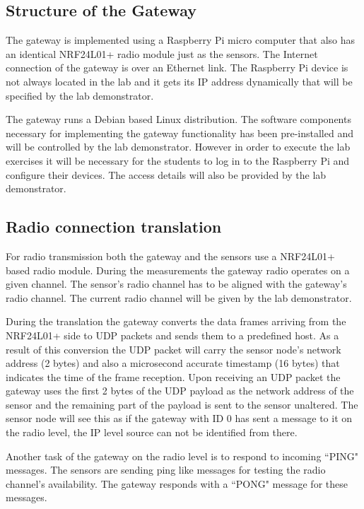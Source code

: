 \documentclass[a4paper]{article}
\begin{document}
\subsection{Structure of the Gateway}

The gateway is implemented using a Raspberry Pi micro computer that also has an identical NRF24L01+
radio module just as the sensors. The Internet connection of the gateway is over an Ethernet link.
The Raspberry Pi device is not always located in the lab and it gets its IP address dynamically
that will be specified by the lab demonstrator.

The gateway runs a Debian based Linux distribution. The software components necessary for
implementing the gateway functionality has been pre-installed and will be controlled by the
lab demonstrator. However in order to execute the lab exercises it will be necessary for the students
to log in to the Raspberry Pi and configure their devices. The access details will also be provided
by the lab demonstrator.

\subsection{Radio connection translation}

For radio transmission both the gateway and the sensors use a NRF24L01+ based radio module.
During the measurements the gateway radio operates on a given channel. The sensor's radio
channel has to be aligned with the gateway's radio channel. The current radio channel will be
given by the lab demonstrator.

During the translation the gateway converts the data frames arriving from the NRF24L01+ side
to UDP packets and sends them to a predefined host. As a result of this conversion the
UDP packet will carry the sensor node's network address (2 bytes) and also a microsecond accurate
timestamp (16 bytes) that indicates the time of the frame reception.
Upon receiving an UDP packet the gateway uses the first 2 bytes of the UDP payload as the
network address of the sensor and the remaining part of the payload is sent to the sensor unaltered.
The sensor node will see this as if the gateway with ID 0 has sent a message to it on the radio level, the IP level
source
can not be identified from there.

Another task of the gateway on the radio level is to respond to incoming ``PING" messages.
The sensors are sending ping like messages for testing the radio channel's availability.
The gateway responds with a ``PONG" message for these messages.
\end{document}
